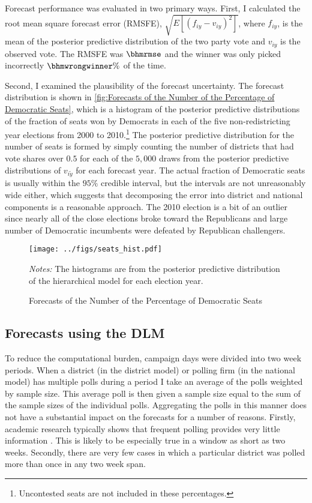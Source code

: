 \documentclass[12pt,final,fleqn]{article}
\theoremstyle{plain}
\begin{document}
Forecast performance was evaluated in two primary ways. First, I calculated the root mean square forecast error (RMSFE), $\sqrt{E[(f_{iy} - v_{iy})^2]}$, where $f_{iy}$, is the mean of the posterior predictive distribution of the two party vote and $v_{iy}$ is the observed vote. The RMSFE was $\bhmrmse$ and the winner was only picked incorrectly $\bhmwrongwinner\%$ of the time. 

Second, I examined the plausibility of the forecast uncertainty. The forecast distribution is shown in \autoref{fig:Forecasts of the Number of the Percentage of Democratic Seats}, which is a histogram of the posterior predictive distributions of the fraction of seats won by Democrats in each of the five non-redistricting year elections from 2000 to 2010.\footnote{Uncontested seats are not included in these percentages.} The posterior predictive distribution for the number of seats is formed by simply counting the number of districts that had vote shares over $0.5$ for each of the $5,000$ draws from the posterior predictive distributions of $v_{i\tilde{y}}$ for each forecast year. The actual fraction of Democratic seats is usually within the $95\%$ credible interval, but the intervals are not unreasonably wide either, which suggests that decomposing the error into district and national components is a reasonable approach. The 2010 election is a bit of an outlier since nearly all of the close elections broke toward the Republicans and large number of Democratic incumbents were defeated by Republican challengers. 

\begin{figure}[!htb]
\centering
\texttt{[image: ../figs/seats\_hist.pdf]}
\vspace{.5cm}
\caption{Forecasts of the Number of the Percentage of Democratic Seats}
\label{fig:Forecasts of the Number of the Percentage of Democratic Seats}
\begin{minipage}{\linewidth}
\footnotesize
\emph{Notes:} The histograms are from the posterior predictive distribution of the hierarchical model for each election year.
\end{minipage}
\end{figure}

\subsection{Forecasts using the DLM} \label{sec: Results from the DLM}
To reduce the computational burden, campaign days were divided into two week periods. When a district (in the district model) or polling firm (in the national model) has multiple polls during a period I take an average of the polls weighted by sample size. This average poll is then given a sample size equal to the sum of the sample sizes of the individual polls. Aggregating the polls in this manner does not have a substantial impact on the forecasts for a number of reasons. Firstly, academic research typically shows that frequent polling provides very little information \citep[e.g.][]{gelman1993american, lock2010bayesian}. This is likely to be especially true in a window as short as two weeks. Secondly, there are very few cases in which a particular district was polled more than once in any two week span. 
\end{document}
